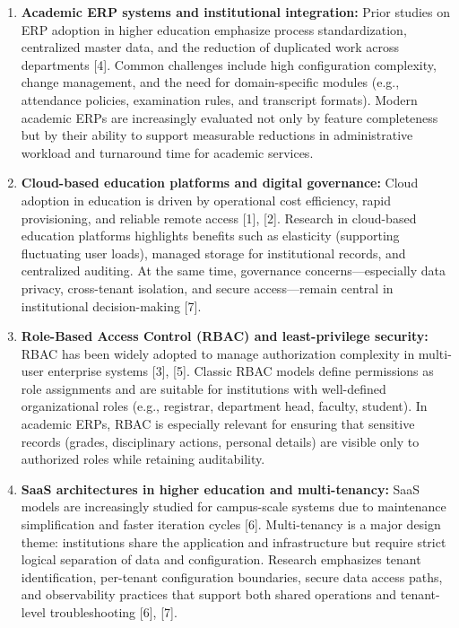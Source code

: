 \documentclass[11pt]{article}
\begin{document}
\begin{enumerate}
\def\labelenumi{\arabic{enumi}.}
\item
  \textbf{Academic ERP systems and institutional integration:} Prior
  studies on ERP adoption in higher education emphasize process
  standardization, centralized master data, and the reduction of
  duplicated work across departments {[}4{]}. Common challenges include
  high configuration complexity, change management, and the need for
  domain-specific modules (e.g., attendance policies, examination rules,
  and transcript formats). Modern academic ERPs are increasingly
  evaluated not only by feature completeness but by their ability to
  support measurable reductions in administrative workload and
  turnaround time for academic services.
\item
  \textbf{Cloud-based education platforms and digital governance:} Cloud
  adoption in education is driven by operational cost efficiency, rapid
  provisioning, and reliable remote access {[}1{]}, {[}2{]}. Research in
  cloud-based education platforms highlights benefits such as elasticity
  (supporting fluctuating user loads), managed storage for institutional
  records, and centralized auditing. At the same time, governance
  concerns---especially data privacy, cross-tenant isolation, and secure
  access---remain central in institutional decision-making {[}7{]}.
\item
  \textbf{Role-Based Access Control (RBAC) and least-privilege
  security:} RBAC has been widely adopted to manage authorization
  complexity in multi-user enterprise systems {[}3{]}, {[}5{]}. Classic
  RBAC models define permissions as role assignments and are suitable
  for institutions with well-defined organizational roles (e.g.,
  registrar, department head, faculty, student). In academic ERPs, RBAC
  is especially relevant for ensuring that sensitive records (grades,
  disciplinary actions, personal details) are visible only to authorized
  roles while retaining auditability.
\item
  \textbf{SaaS architectures in higher education and multi-tenancy:}
  SaaS models are increasingly studied for campus-scale systems due to
  maintenance simplification and faster iteration cycles {[}6{]}.
  Multi-tenancy is a major design theme: institutions share the
  application and infrastructure but require strict logical separation
  of data and configuration. Research emphasizes tenant identification,
  per-tenant configuration boundaries, secure data access paths, and
  observability practices that support both shared operations and
  tenant-level troubleshooting {[}6{]}, {[}7{]}.
\end{enumerate}
\end{document}

